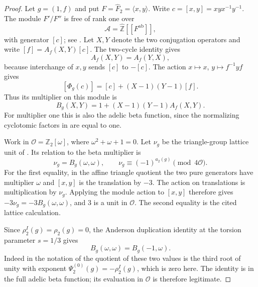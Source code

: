 \begin{proof}
Let $g=(1,f)$ and put $F=\widehat F_2=\langle x,y\rangle$.
Write $c=[x,y]=xyx^{-1}y^{-1}$. The module $F'/F''$ is free of
rank one over
\[
 \mathcal A=\widehat{\mathbb Z}[[F^{\mathrm{ab}}]],
\]
with generator $[c]$; see \cite[\S2.3, p.~101]{Furusho2003}.
Let $X,Y$ denote the two conjugation operators and write
$[f]=A_f(X,Y)[c]$. The two-cycle identity gives
\begin{equation}
 A_f(X,Y)=A_f(Y,X),
 \label{eq:harmonic-A-symmetry}
\end{equation}
because interchange of $x,y$ sends $[c]$ to $-[c]$.
The action $x\mapsto x$, $y\mapsto f^{-1}yf$ gives
\[
 [\Phi_g(c)]=[c]+(X-1)(Y-1)[f].
\]
Thus its multiplier on this module is
\begin{equation}
 B_g(X,Y)=1+(X-1)(Y-1)A_f(X,Y).
 \label{eq:harmonic-beta-coefficient}
\end{equation}
For multiplier one this is also the adelic beta function, since
the normalizing cyclotomic factors in \cite[\S2.3]{Furusho2003}
are equal to one.

Work in $\mathcal O=\mathbb Z_2[\omega]$, where
$\omega^2+\omega+1=0$. Let $\nu_g$ be the triangle-group lattice
unit of \cite[Lemma 15]{H17}. Its relation to the beta multiplier is
\begin{equation}
 \nu_g=B_g(\omega,\omega),\qquad
 \nu_g\equiv(-1)^{a_2(g)}\pmod{4\mathcal O}.
 \label{eq:harmonic-triangle-beta}
\end{equation}
For the first equality, in the affine triangle quotient the two pure
generators have multiplier $\omega$ and $[x,y]$ is the translation
by $-3$. The action on translations is multiplication by $\nu_g$.
Applying the module action to $[x,y]$ therefore gives
$-3\nu_g=-3B_g(\omega,\omega)$, and $3$ is a unit in
$\mathcal O$. The second equality is the cited lattice calculation.

Since $\rho_2^I(g)=\rho_2(g)=0$, the Anderson duplication identity
at the torsion parameter $s=1/3$ gives
\begin{equation}
 B_g(\omega,\omega)=B_g(-1,\omega).
 \label{eq:harmonic-duplication}
\end{equation}
Indeed in the notation of \cite[Theorem 3.1]{Furusho2003} the
quotient of these two values is the third root of unity with exponent
$\Psi_2^{(0)}(g)=-\rho_2^I(g)$, which is zero here. The identity
is in the full adelic beta function; its evaluation in
$\mathcal O$ is therefore legitimate.


\end{proof}
